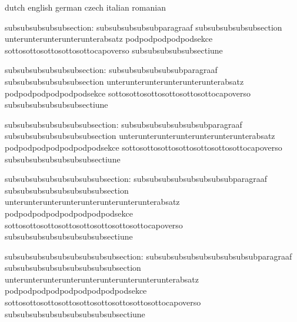 
\unprotect

\startvariables                     dutch                                                  english
                                    german                                                 czech
                                    italian                                                romanian

            subsubsubsubsubsection: subsubsubsubsubparagraaf                               subsubsubsubsubsection
                                    unterunterunterunterunterabsatz                        podpodpodpodpodsekce
                                    sottosottosottosottosottocapoverso                     subsubsubsubsubsectiune

         subsubsubsubsubsubsection: subsubsubsubsubsubparagraaf                            subsubsubsubsubsubsection
                                    unterunterunterunterunterunterabsatz                   podpodpodpodpodpodsekce
                                    sottosottosottosottosottosottocapoverso                subsubsubsubsubsubsectiune

      subsubsubsubsubsubsubsection: subsubsubsubsubsubsubparagraaf                         subsubsubsubsubsubsubsection
                                    unterunterunterunterunterunterunterabsatz              podpodpodpodpodpodpodsekce
                                    sottosottosottosottosottosottosottocapoverso           subsubsubsubsubsubsubsectiune

   subsubsubsubsubsubsubsubsection: subsubsubsubsubsubsubsubparagraaf                      subsubsubsubsubsubsubsubsection
                                    unterunterunterunterunterunterunterunterabsatz         podpodpodpodpodpodpodpodsekce
                                    sottosottosottosottosottosottosottosottocapoverso      subsubsubsubsubsubsubsubsectiune

subsubsubsubsubsubsubsubsubsection: subsubsubsubsubsubsubsubsubparagraaf                   subsubsubsubsubsubsubsubsubsection
                                    unterunterunterunterunterunterunterunterunterabsatz    podpodpodpodpodpodpodpodpodsekce
                                    sottosottosottosottosottosottosottosottosottocapoverso subsubsubsubsubsubsubsubsubsectiune

